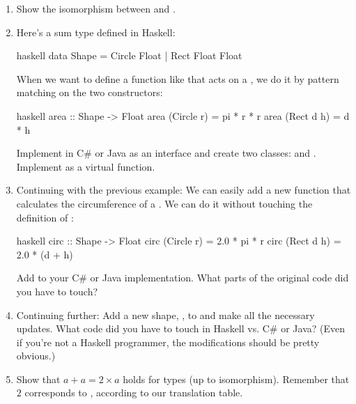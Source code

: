 \begin{enumerate}
  \tightlist
  \item
        Show the isomorphism between  and
        .
  \item
        Here's a sum type defined in Haskell:

        \begin{snip}{haskell}
data Shape = Circle Float
           | Rect Float Float
\end{snip}
        When we want to define a function like  that acts on a
        , we do it by pattern matching on the two constructors:

        \begin{snip}{haskell}
area :: Shape -> Float
area (Circle r) = pi * r * r
area (Rect d h) = d * h
\end{snip}
        Implement  in C\# or Java as an interface and create two
        classes:  and . Implement  as
        a virtual function.
  \item
        Continuing with the previous example: We can easily add a new function
         that calculates the circumference of a .
        We can do it without touching the definition of :

        \begin{snip}{haskell}
circ :: Shape -> Float
circ (Circle r) = 2.0 * pi * r
circ (Rect d h) = 2.0 * (d + h)
\end{snip}
        Add  to your C\# or Java implementation. What parts of
        the original code did you have to touch?
  \item
        Continuing further: Add a new shape, , to
         and make all the necessary updates. What code did you
        have to touch in Haskell vs. C\# or Java? (Even if you're not a
        Haskell programmer, the modifications should be pretty obvious.)
  \item
        Show that $a + a = 2 \times a$ holds for types (up to
        isomorphism). Remember that $2$ corresponds to ,
        according to our translation table.
\end{enumerate}
